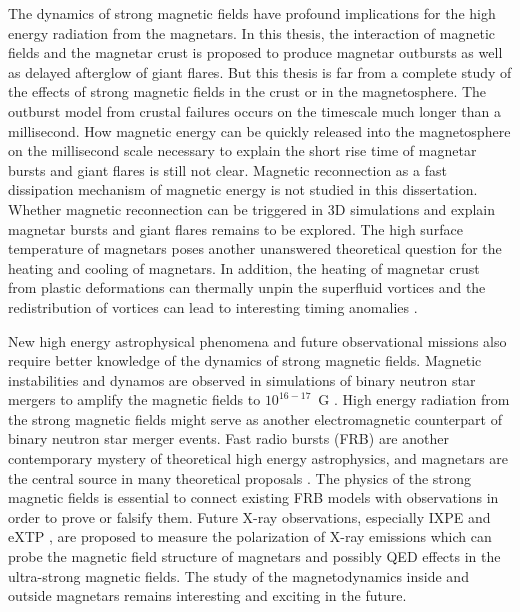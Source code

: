 The dynamics of strong magnetic fields have profound implications for the high energy radiation from the magnetars.
In this thesis, the interaction of magnetic fields and the magnetar crust is proposed to produce magnetar outbursts as well as delayed afterglow of giant flares.
But this thesis is far from a complete study of the effects of strong magnetic fields in the crust or in the magnetosphere.
The outburst model from crustal failures occurs on the timescale much longer than a millisecond.
How magnetic energy can be quickly released into the magnetosphere on the millisecond scale necessary to explain the short rise time of magnetar bursts and giant flares is still not clear.
Magnetic reconnection as a fast dissipation mechanism of magnetic energy is not studied in this dissertation.
Whether magnetic reconnection can be triggered in 3D simulations and explain magnetar bursts and giant flares remains to be explored.
The high surface temperature of magnetars poses another unanswered theoretical question for the heating and cooling of magnetars.
In addition, the heating of magnetar crust from plastic deformations can thermally unpin the superfluid vortices and the redistribution of vortices can lead to interesting timing anomalies \citep{1996ApJ...457..844L}.

New high energy astrophysical phenomena and future observational missions also require better knowledge of the dynamics of strong magnetic fields.
Magnetic instabilities and dynamos are observed in simulations of binary neutron star mergers to amplify the magnetic fields to $10^{16-17}$~G \citep{2014PhRvD..90d1502K,2015ApJ...809...39G}.
High energy radiation from the strong magnetic fields might serve as another electromagnetic counterpart of binary neutron star merger events.
Fast radio bursts (FRB) are another contemporary mystery of theoretical high energy astrophysics, and magnetars are the central source in many theoretical proposals \citep{2017MNRAS.468.2726K,2018ApJ...868L...4M,2019MNRAS.485.4091M}.
The physics of the strong magnetic fields is essential to connect existing FRB models with observations in order to prove or falsify them.
Future X-ray observations, especially IXPE \citep{WEISSKOPF20161179} and eXTP \citep{2016SPIE.9905E..1QZ}, are proposed to measure the polarization of X-ray emissions which can probe the magnetic field structure of magnetars and possibly QED effects in the ultra-strong magnetic fields.
The study of the magnetodynamics inside and outside magnetars remains interesting and exciting in the future.





